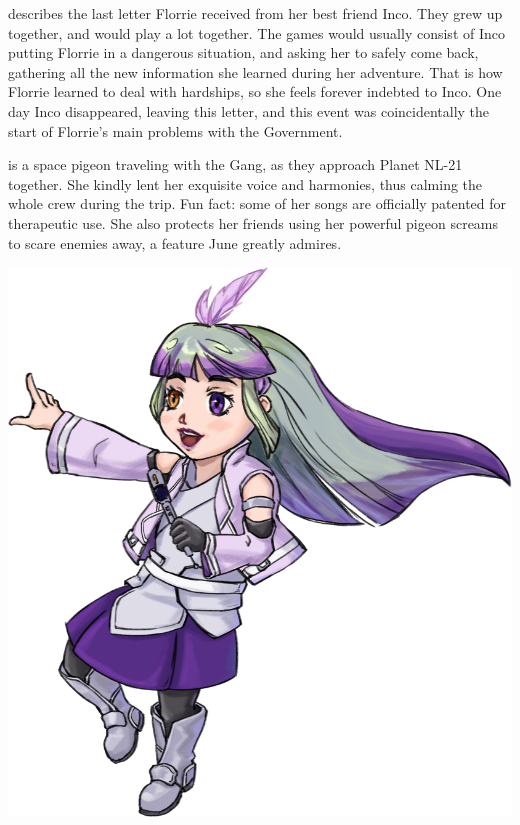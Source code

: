 

 describes the last letter Florrie received from her best friend Inco. They grew up together, and would play a lot together. The games would usually consist of Inco putting Florrie in a dangerous situation, and asking her to safely come back, gathering all the new information she learned during her adventure. That is how Florrie learned to deal with hardships, so she feels forever indebted to Inco. One day Inco disappeared, leaving this letter, and this event was coincidentally the start of Florrie's main problems with the Government.\\

\begin{minipage}{0.6\textwidth}
 is a space pigeon traveling with the Gang, as they approach Planet NL-21 together. She kindly lent her exquisite voice and harmonies, thus calming the whole crew during the trip. Fun fact: some of her songs are officially patented for therapeutic use. She also protects her friends using her powerful pigeon screams to scare enemies away, a feature June greatly admires.
\end{minipage}
\begin{minipage}{0.5\textwidth}
\hfill
\includegraphics[width=.9\textwidth]{Assets/zephy_ff_s}
\end{minipage}

\clearpage
